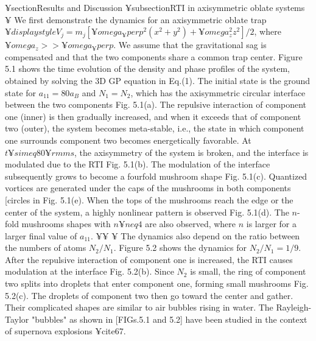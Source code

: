 {{{{{¥section{Results and Discussion}
¥subsection{RTI in axisymmetric oblate systems}
¥ We first demonstrate the dynamics for an axisymmetric
oblate trap $¥displaystyle V_j = m_j [¥omega_¥perp^2 (x^2+y^2)+¥omega_z^2 z^2]/2$, where $¥omega_z >> ¥omega_¥perp$.
We assume that the gravitational sag is compensated and
that the two components share a common trap center. Figure 5.1
shows the time evolution of the density and phase profiles of
the system, obtained by solving the 3D GP equation in Eq.(1).
The initial state is the ground state for $a_{11} = 80 a_B$ and
$N_1 = N_2$, which has the axisymmetric circular interface between
the two components Fig. 5.1(a). The repulsive interaction
of component one (inner) is then gradually increased, and
when it exceeds that of component two (outer), the system
becomes meta-stable, i.e., the state in which component one
surrounds component two becomes energetically favorable.
At $t ¥simeq 80 {¥rm ms}$, the axisymmetry of the system is broken, and
the interface is modulated due to the RTI Fig. 5.1(b). The
modulation of the interface subsequently grows to become a
fourfold mushroom shape Fig. 5.1(c). Quantized vortices are
generated under the caps of the mushrooms in both components
[circles in Fig. 5.1(e). When the tops of the mushrooms
reach the edge or the center of the system, a highly nonlinear
pattern is observed Fig. 5.1(d). The $n$-fold mushrooms shapes
with $n ¥neq 4$ are also observed, where $n$ is larger for a larger final
value of $a_{11}$.
¥¥
¥ The dynamics also depend on the ratio between the
numbers of atoms $N_2 / N_1$. Figure 5.2 shows the dynamics for 
$N_2/N_1 = 1/9$. After the repulsive interaction of component
one is increased, the RTI causes modulation at the interface
Fig. 5.2(b). Since $N_2$ is small, the ring of component two
splits into droplets that enter component one, forming small
mushrooms Fig. 5.2(c). The droplets of component two then
go toward the center and gather. Their complicated shapes
are similar to air bubbles rising in water. The Rayleigh-Taylor
"bubbles" as shown in [FIGs.5.1 and 5.2] have been studied in the
context of supernova explosions ¥cite{67}.

}}}}}
